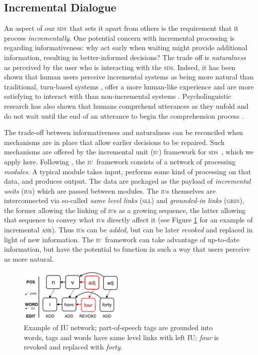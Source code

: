 \documentclass[11pt]{article}
\newcommand{\sds}[0]{\textsc{sds}}
\newcommand{\asr}[0]{\textsc{asr}}
\newcommand{\iu}[0]{\textsc{iu}}
\begin{document}
\subsection{Incremental Dialogue}

An aspect of our \sds\ that sets it apart from others is the requirement that it process \emph{incrementally}. One potential concern with incremental processing is regarding informativeness: why act early when waiting might provide additional information, resulting in better-informed decisions? The trade off is \emph{naturalness} as perceived by the user who is interacting with the \sds. Indeed, it has been shown that human users perceive incremental systems as being more natural than traditional, turn-based systems \cite{Aist2006,Skantze2009,skantze2010sigdial,Asri2014}, offer a more human-like experience  \cite{Edlund2008b} and are more satisfying to interact with than non-incremental systems \cite{Aistetal:incrunder-short}. Psycholinguistic research has also shown that humans comprehend utterances as they unfold and do not wait until the end of an utterance to begin the comprehension process \cite{Tanenhaus1995,Spivey_2002tw}. 

The trade-off between informativeness and naturalness can be reconciled when mechanisms are in place that allow earlier decisions to be repaired. Such mechanisms are offered by the incremental unit (\iu) framework for \sds\ \cite{Schlangen2011}, which we apply here. Following , the \iu\ framework consists of a network of processing \emph{modules}. A typical module takes input, performs some kind of processing on that data, and produces output. The data are packaged as the payload of \emph{incremental units} (\textsc{iu}s) which are passed between modules. The \textsc{iu}s themselves are interconnected via so-called \emph{same level links} (\textsc{sll}) and \emph{grounded-in links} (\textsc{grin}), the former allowing the linking of \textsc{iu}s as a growing sequence, the latter allowing that sequence to convey what \textsc{iu}s directly affect it (see Figure \ref{fig:iu_example} for an example of incremental \asr). Thus \iu s can be \emph{added}, but can be later \emph{revoked} and replaced in light of new information. The \iu\ framework can take advantage of up-to-date information, but have the potential to function in such a way that users perceive as more natural.

\begin{figure} %
  \centering
      \includegraphics[width=0.45\textwidth]{figures/005_iu_example.png}	
      \caption{Example of IU network; part-of-speech tags are grounded into words, tags and words have same level links with left IU; \emph{four} is revoked and replaced with \emph{forty}.\label{fig:iu_example}}
            \vspace{-0.25cm}
\end{figure}
\end{document}
